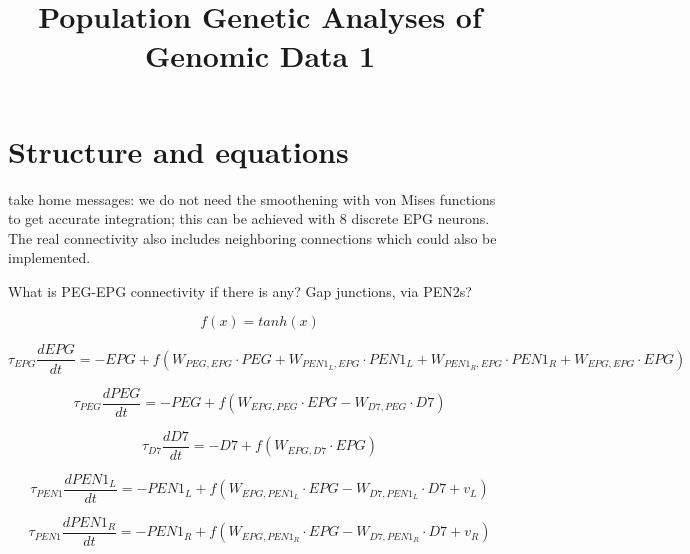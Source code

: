 \documentclass{article}
\title{Population Genetic Analyses of Genomic Data 1}
\begin{document}

\begin{center}
\end{center}



\section{Structure and equations}

take home messages: we do not need the smoothening with von Mises functions to get accurate integration; this can be achieved with 8 discrete EPG neurons. The real connectivity also includes neighboring connections which could also be implemented.

What is PEG-EPG connectivity if there is any? Gap junctions, via PEN2s?

\begin{equation}
f(x) = tanh(x)
\end{equation}

\begin{equation}
\tau_{EPG} \dfrac{dEPG}{dt} = -EPG + f(W_{PEG,EPG}\cdot PEG + W_{PEN1_L,EPG}\cdot PEN1_L + W_{PEN1_R,EPG}\cdot PEN1_R + W_{EPG,EPG}\cdot EPG)
\end{equation}

\begin{equation}
\tau_{PEG} \dfrac{dPEG}{dt} = -PEG + f(W_{EPG,PEG}\cdot EPG - W_{D7,PEG}\cdot D7 )
\end{equation}

\begin{equation}
\tau_{D7} \dfrac{dD7}{dt} =-D7 + f(W_{EPG,D7}\cdot EPG)
\end{equation}

\begin{equation}
\tau_{PEN1} \dfrac{dPEN1_L}{dt} = -PEN1_L + f(W_{EPG,PEN1_L}\cdot EPG - W_{D7,PEN1_L}\cdot D7 + v_L )
\end{equation}

\begin{equation}
\tau_{PEN1} \dfrac{dPEN1_R}{dt} = -PEN1_R + f(W_{EPG,PEN1_R}\cdot EPG - W_{D7,PEN1_R}\cdot D7 + v_R )
\end{equation}
\end{document}
